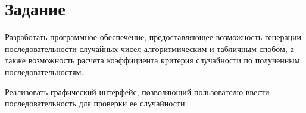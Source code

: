 \chapter{Задание}

Разработать программное обеспечение, предоставляющее возможность генерации
последовательности случайных чисел алгоритмическим и табличным спобом, а также
возможность расчета коэффициента критерия случайности по полученным
последовательностям.

Реализовать графический интерфейс, позволяющий пользователю ввести
последовательность для проверки ее случайности.

